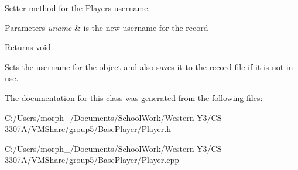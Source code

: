 Setter method for the \mbox{\hyperlink{class_player}{Player}}\textquotesingle{}s username. 


\begin{DoxyParams}{Parameters}
{\em uname} & is the new username for the record \\
\hline
\end{DoxyParams}
\begin{DoxyReturn}{Returns}
void
\end{DoxyReturn}
Sets the username for the object and also saves it to the record file if it is not in use. 

The documentation for this class was generated from the following files\+:\begin{DoxyCompactItemize}
\item 
C\+:/\+Users/morph\+\_/\+Documents/\+School\+Work/\+Western Y3/\+C\+S 3307\+A/\+V\+M\+Share/group5/\+Base\+Player/Player.\+h\item 
C\+:/\+Users/morph\+\_/\+Documents/\+School\+Work/\+Western Y3/\+C\+S 3307\+A/\+V\+M\+Share/group5/\+Base\+Player/Player.\+cpp\end{DoxyCompactItemize}
